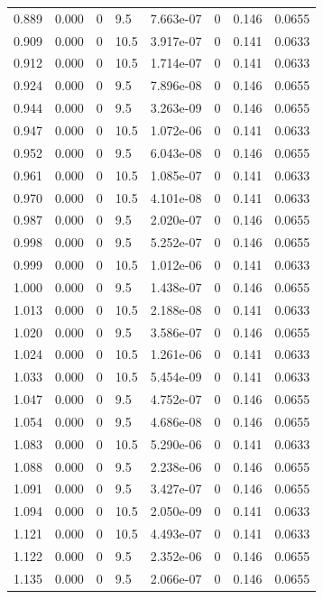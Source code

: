\documentclass[preview]{standalone}
\begin{document}
{{{{\begin{tabular}{L{1.2cm}C{1.2cm} C{0.3cm}C{0.5cm} C{1.4cm}C{1.4cm} C{1.4cm}C{1.4cm}}
  0.889  &  0.000  & 0     & 9.5 &  7.663e-07  & 0  & 0.146 &  0.0655   \\ 
  0.909  &  0.000  & 0     & 10.5 &  3.917e-07  & 0  & 0.141 &  0.0633   \\ 
  0.912  &  0.000  & 0     & 10.5 &  1.714e-07  & 0  & 0.141 &  0.0633   \\ 
  0.924  &  0.000  & 0     & 9.5 &  7.896e-08  & 0  & 0.146 &  0.0655   \\ 
  0.944  &  0.000  & 0     & 9.5 &  3.263e-09  & 0  & 0.146 &  0.0655   \\ 
  0.947  &  0.000  & 0     & 10.5 &  1.072e-06  & 0  & 0.141 &  0.0633   \\ 
  0.952  &  0.000  & 0     & 9.5 &  6.043e-08  & 0  & 0.146 &  0.0655   \\ 
  0.961  &  0.000  & 0     & 10.5 &  1.085e-07  & 0  & 0.141 &  0.0633   \\ 
  0.970  &  0.000  & 0     & 10.5 &  4.101e-08  & 0  & 0.141 &  0.0633   \\ 
  0.987  &  0.000  & 0     & 9.5 &  2.020e-07  & 0  & 0.146 &  0.0655   \\ 
  0.998  &  0.000  & 0     & 9.5 &  5.252e-07  & 0  & 0.146 &  0.0655   \\ 
  0.999  &  0.000  & 0     & 10.5 &  1.012e-06  & 0  & 0.141 &  0.0633   \\ 
  1.000  &  0.000  & 0     & 9.5 &  1.438e-07  & 0  & 0.146 &  0.0655   \\ 
  1.013  &  0.000  & 0     & 10.5 &  2.188e-08  & 0  & 0.141 &  0.0633   \\ 
  1.020  &  0.000  & 0     & 9.5 &  3.586e-07  & 0  & 0.146 &  0.0655   \\ 
  1.024  &  0.000  & 0     & 10.5 &  1.261e-06  & 0  & 0.141 &  0.0633   \\ 
  1.033  &  0.000  & 0     & 10.5 &  5.454e-09  & 0  & 0.141 &  0.0633   \\ 
  1.047  &  0.000  & 0     & 9.5 &  4.752e-07  & 0  & 0.146 &  0.0655   \\ 
  1.054  &  0.000  & 0     & 9.5 &  4.686e-08  & 0  & 0.146 &  0.0655   \\ 
  1.083  &  0.000  & 0     & 10.5 &  5.290e-06  & 0  & 0.141 &  0.0633   \\ 
  1.088  &  0.000  & 0     & 9.5 &  2.238e-06  & 0  & 0.146 &  0.0655   \\ 
  1.091  &  0.000  & 0     & 9.5 &  3.427e-07  & 0  & 0.146 &  0.0655   \\ 
  1.094  &  0.000  & 0     & 10.5 &  2.050e-09  & 0  & 0.141 &  0.0633   \\ 
  1.121  &  0.000  & 0     & 10.5 &  4.493e-07  & 0  & 0.141 &  0.0633   \\ 
  1.122  &  0.000  & 0     & 9.5 &  2.352e-06  & 0  & 0.146 &  0.0655   \\ 
  1.135  &  0.000  & 0     & 9.5 &  2.066e-07  & 0  & 0.146 &  0.0655   \\ 
\hline 
\end{tabular} 

}}}}
\end{document}
